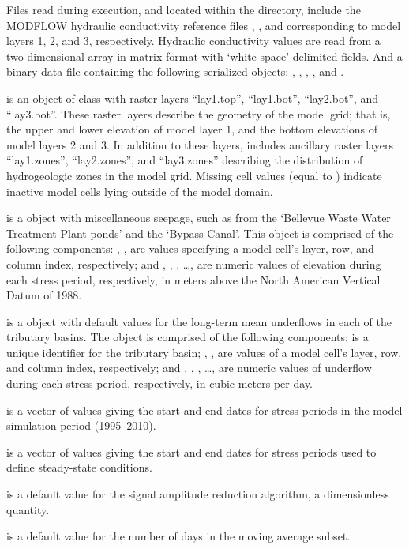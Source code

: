 \documentclass[letterpaper]{book}
\begin{document}
\begin{Details}\relax
Files read during execution, and located within the  directory, include
the MODFLOW hydraulic conductivity reference files , , and 
corresponding to model layers 1, 2, and 3, respectively.
Hydraulic conductivity values are read from a two-dimensional array in matrix format with `white-space' delimited fields.
And a binary data file  containing the following serialized \R{} objects:
, , , , and .

 is an object of  class with raster layers
``lay1.top'', ``lay1.bot'', ``lay2.bot'', and ``lay3.bot''.
These raster layers describe the geometry of the model grid; that is,
the upper and lower elevation of model layer 1, and the bottom elevations of model layers 2 and 3.
In addition to these layers,  includes ancillary raster layers ``lay1.zones'', ``lay2.zones'', and ``lay3.zones''
describing the distribution of hydrogeologic zones in the model grid.
Missing cell values (equal to ) indicate inactive model cells lying outside of the model domain.

 is a  object with miscellaneous seepage,
such as from the `Bellevue Waste Water Treatment Plant ponds' and the `Bypass Canal'.
This object is comprised of the following components:
, ,  are  values specifying a model cell's layer, row, and column index, respectively; and
, , , \dots,  are numeric values of elevation during each stress period, respectively,
in meters above the North American Vertical Datum of 1988.

 is a  object with default values for the long-term mean underflows in each of the tributary basins.
The object is comprised of the following components:
 is a unique identifier for the tributary basin;
, ,  are  values of a model cell's layer, row, and column index, respectively; and
, , , \dots,  are numeric values of underflow during each stress period, respectively,
in cubic meters per day.

 is a vector of  values giving the start and end dates for stress periods in the model simulation period (1995--2010).

 is a vector of  values giving the start and end dates for stress periods used to define steady-state conditions.

 is a  default value for the signal amplitude reduction algorithm, a dimensionless quantity.

 is a  default value for the number of days in the moving average subset.
\end{Details}
\end{document}
